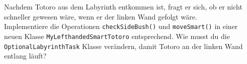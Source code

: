 
	Nachdem Totoro aus dem Labyrinth entkommen ist, fragt er sich, ob er nicht schneller gewesen wäre, wenn er der linken Wand gefolgt wäre.\\

	
		 Implementiere die Operationen \lstinline{checkSideBush()} und \lstinline{moveSmart()} in einer neuen Klasse \lstinline{MyLefthandedSmartTotoro} entsprechend.
		 Wie musst du die \lstinline{OptionalLabyrinthTask} Klasse verändern, damit Totoro an der linken Wand entlang läuft?\\
	

